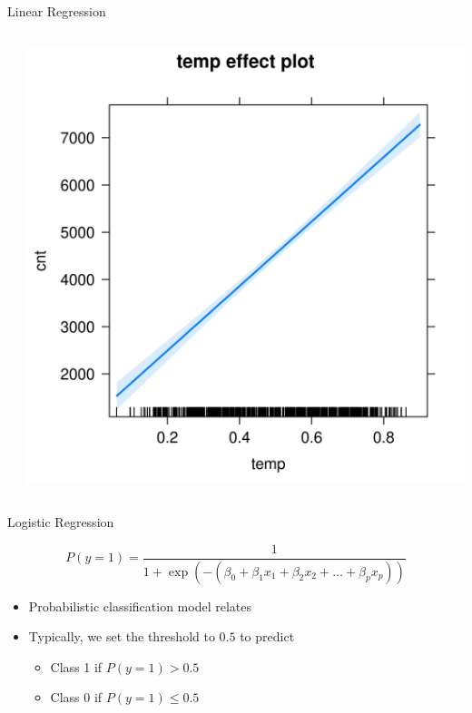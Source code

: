 \documentclass[11pt,compress,t,notes=noshow, aspectratio=169, xcolor=table]{beamer}
\begin{document}
\begin{frame}{Linear Regression}

\begin{columns}[T]
\begin{column}{0.55\textwidth}
\tiny

\end{column}
\begin{column}{0.45\textwidth}  %
  \includegraphics[width = \textwidth]{figure/lm_effect_plot.png}
\end{column}
\end{columns}
\end{frame}

	
\begin{frame}{Logistic Regression}

    $$P(y = 1) =\frac{1}{1 + \exp(-( \beta_0 + \beta_1 x_1 + \beta_2 x_2 + \ldots + \beta_p x_p ))} $$

    \begin{itemize}
        \item Probabilistic \alert{classification} model relates
        \item Typically, we set the threshold to $0.5$ to predict 
        \begin{itemize}
            \item Class 1 if $P(y=1) > 0.5$
            \item Class 0 if $P(y=1) \leq 0.5$
        \end{itemize}
    \end{itemize}	

\end{frame}
\end{document}
